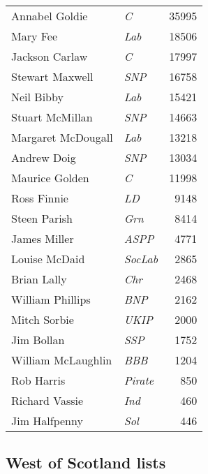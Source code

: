 {\footnotesize
\begin{tabular*}{\columnwidth}{@{\extracolsep{\fill}} p{} >{\itshape}l r @{\extracolsep{\fill}}}
Annabel Goldie & C & 35995\\%
Mary Fee & Lab & 18506\\%
Jackson Carlaw & C & 17997\\%
Stewart Maxwell & SNP & 16758\\%
Neil Bibby & Lab & 15421\\%
Stuart McMillan & SNP & 14663\\%
Margaret McDougall & Lab & 13218\\%
\hline
Andrew Doig & SNP & 13034\\
Maurice Golden & C & 11998\\
Ross Finnie & LD & 9148\\
Steen Parish & Grn & 8414\\
James Miller & ASPP & 4771\\
Louise McDaid & SocLab & 2865\\
Brian Lally & Chr & 2468\\
William Phillips & BNP & 2162\\
Mitch Sorbie & UKIP & 2000\\
Jim Bollan & SSP & 1752\\
William McLaughlin & BBB & 1204\\
Rob Harris & Pirate & 850\\
Richard Vassie & Ind & 460\\
Jim Halfpenny & Sol & 446\\
\end{tabular*}

}

\vfill

\subsection*{West of Scotland lists}

